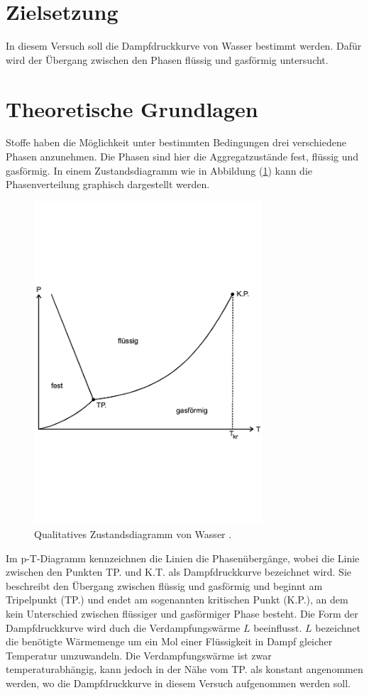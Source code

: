 \section{Zielsetzung}
In diesem Versuch soll die Dampfdruckkurve von Wasser bestimmt werden.
Dafür wird der Übergang zwischen den Phasen flüssig und gasförmig untersucht.

\section{Theoretische Grundlagen}
Stoffe haben die Möglichkeit unter bestimmten Bedingungen drei verschiedene Phasen anzunehmen.
Die Phasen sind hier die Aggregatzustände fest, flüssig und gasförmig.
In einem Zustandsdiagramm wie in Abbildung (\ref{fig:zustand}) kann die Phasenverteilung graphisch dargestellt werden.

\begin{figure}
  \centering
  \includegraphics[width=8.5cm]{zustand.pdf}
  \caption{Qualitatives Zustandsdiagramm von Wasser \cite{V203}.}
  \label{fig:zustand}
\end{figure}

\noindent
Im p-T-Diagramm kennzeichnen die Linien die Phasenübergänge, wobei die Linie zwischen den Punkten
TP. und K.T. als Dampfdruckkurve bezeichnet wird.
Sie beschreibt den Übergang zwischen flüssig und gasförmig und beginnt am Tripelpunkt (TP.) und endet am sogenannten kritischen Punkt (K.P.),
an dem kein Unterschied zwischen flüssiger und gasförmiger Phase besteht.
Die Form der Dampfdruckkurve wird duch die Verdampfungswärme $L$ beeinflusst.
$L$ bezeichnet die benötigte Wärmemenge um ein Mol einer Flüssigkeit in Dampf gleicher Temperatur umzuwandeln.
Die Verdampfungswärme ist zwar temperaturabhängig, kann jedoch in der Nähe vom TP. als konstant angenommen werden,
wo die Dampfdruckkurve in diesem Versuch aufgenommen werden soll.

